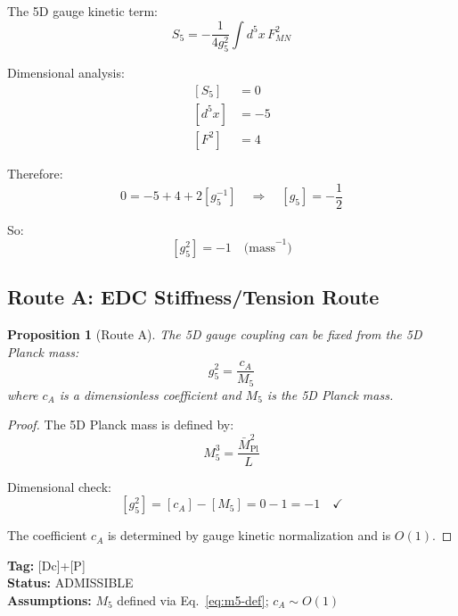 \documentclass[11pt,a4paper]{article}
\newtheorem{proposition}{Proposition}[section]
\begin{document}
The 5D gauge kinetic term:
\begin{equation}
\label{eq:5d-kinetic}
S_5 = -\frac{1}{4g_5^2} \int d^5x \, F_{MN}^2
\end{equation}

Dimensional analysis:
\begin{align}
\label{eq:g5-dim-analysis}
[S_5] &= 0 \\
\label{eq:g5-dim-d5x}
[d^5x] &= -5 \\
\label{eq:g5-dim-f2}
[F^2] &= 4
\end{align}

Therefore:
\begin{equation}
\label{eq:g5-dim-result}
0 = -5 + 4 + 2[g_5^{-1}] \quad \Rightarrow \quad [g_5] = -\frac{1}{2}
\end{equation}

So:
\begin{equation}
\label{eq:g5-sq-dim}
\boxed{[g_5^2] = -1 \quad \text{(mass}^{-1}\text{)}}
\end{equation}

\subsection{Route A: EDC Stiffness/Tension Route}
\label{subsec:route-a}

\begin{proposition}[Route A]
\label{prop:route-a}
The 5D gauge coupling can be fixed from the 5D Planck mass:
\begin{equation}
\label{eq:route-a-formula}
g_5^2 = \frac{c_A}{M_5}
\end{equation}
where $c_A$ is a dimensionless coefficient and $M_5$ is the 5D Planck mass.
\end{proposition}

\begin{proof}
The 5D Planck mass is defined by:
\begin{equation}
\label{eq:m5-def}
M_5^3 = \frac{\bar{M}_{\text{Pl}}^2}{L}
\end{equation}

Dimensional check:
\begin{equation}
\label{eq:route-a-dim}
[g_5^2] = [c_A] - [M_5] = 0 - 1 = -1 \quad \checkmark
\end{equation}

The coefficient $c_A$ is determined by gauge kinetic normalization and is $O(1)$.
\end{proof}

\textbf{Tag:} [Dc]+[P] \\
\textbf{Status:} ADMISSIBLE \\
\textbf{Assumptions:} $M_5$ defined via Eq.~\eqref{eq:m5-def}; $c_A \sim O(1)$
\end{document}
